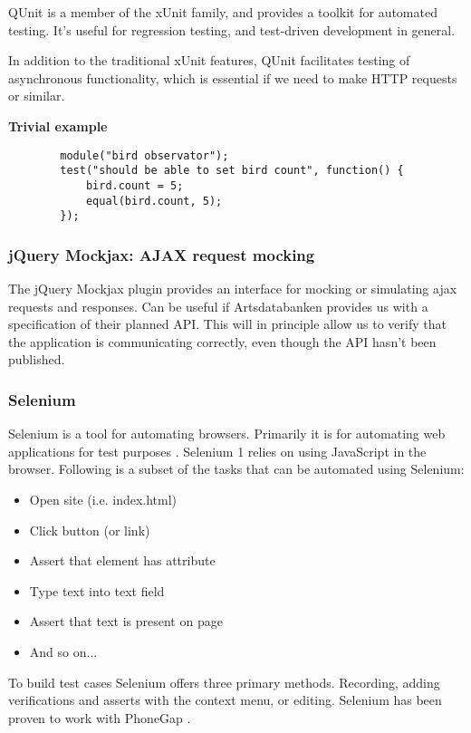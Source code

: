 	QUnit is a member of the xUnit family, and provides a toolkit for automated
	testing. It's useful for regression testing, and test-driven development in
	general.

	In addition to the traditional xUnit features, QUnit facilitates testing of
	asynchronous functionality, which is essential if we need to make HTTP
	requests or similar.

	\textbf{Trivial example}

	\begin{lstlisting}
		module("bird observator");
		test("should be able to set bird count", function() {
			bird.count = 5;
			equal(bird.count, 5);
		});
	\end{lstlisting}

\subsubsection{jQuery Mockjax: AJAX request mocking}

	The jQuery Mockjax plugin provides an interface for mocking or simulating
	ajax requests and responses. \cite{github:jquery-mockjax} Can be useful if Artsdatabanken provides us
	with a specification of their planned API. This will in principle allow us
	to verify that the application is communicating correctly, even though the
	API hasn't been published.

\subsubsection{Selenium}

	Selenium is a tool for automating browsers. Primarily it is for automating
	web applications for test purposes \cite{seleniumhq:home}. Selenium 1 relies
	on using JavaScript in the browser. Following is a subset of the tasks that
	can be automated using Selenium:

	\begin{itemize}
		\item Open site (i.e. index.html)
		\item Click button (or link)
		\item Assert that element has attribute
		\item Type text into text field
		\item Assert that text is present on page
		\item And so on...
	\end{itemize}

	To build test cases Selenium offers three primary methods. Recording, adding
	verifications and asserts with the context menu, or editing. Selenium has
	been proven to work with PhoneGap \cite{phonegap:automatic-test-cases}.

